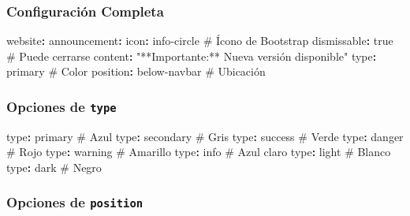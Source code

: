 \documentclass[
  doc,
  floatsintext,
  longtable,
  a4paper,
  nolmodern,
  notxfonts,
  notimes,
  12pt,
  colorlinks=true,linkcolor=blue,citecolor=blue,urlcolor=blue]{apa7}
\newenvironment{Shaded}{\begin{snugshade}}{\end{snugshade}}
\newcommand{\AttributeTok}[1]{\textcolor[rgb]{0.40,0.45,0.13}{#1}}
\newcommand{\CharTok}[1]{\textcolor[rgb]{0.13,0.47,0.30}{#1}}
\newcommand{\CommentTok}[1]{\textcolor[rgb]{0.37,0.37,0.37}{#1}}
\newcommand{\FunctionTok}[1]{\textcolor[rgb]{0.28,0.35,0.67}{#1}}
\newcommand{\KeywordTok}[1]{\textcolor[rgb]{0.00,0.23,0.31}{\textbf{#1}}}
\newcommand{\StringTok}[1]{\textcolor[rgb]{0.13,0.47,0.30}{#1}}
\begin{document}
\subsubsection{Configuración Completa}\label{configuraciuxf3n-completa}

\begin{Shaded}
\begin{Highlighting}[]
\FunctionTok{website}\KeywordTok{:}
\AttributeTok{  }\FunctionTok{announcement}\KeywordTok{:}
\AttributeTok{    }\FunctionTok{icon}\KeywordTok{:}\AttributeTok{ info{-}circle}\CommentTok{               \# Ícono de Bootstrap}
\AttributeTok{    }\FunctionTok{dismissable}\KeywordTok{:}\AttributeTok{ }\CharTok{true}\CommentTok{               \# Puede cerrarse}
\AttributeTok{    }\FunctionTok{content}\KeywordTok{:}\AttributeTok{ }\StringTok{"**Importante:** Nueva versión disponible"}
\AttributeTok{    }\FunctionTok{type}\KeywordTok{:}\AttributeTok{ primary}\CommentTok{                   \# Color}
\AttributeTok{    }\FunctionTok{position}\KeywordTok{:}\AttributeTok{ below{-}navbar}\CommentTok{          \# Ubicación}
\end{Highlighting}
\end{Shaded}

\subsubsection{\texorpdfstring{Opciones de
\texttt{type}}{Opciones de type}}\label{opciones-de-type}

\begin{Shaded}
\begin{Highlighting}[]
\FunctionTok{type}\KeywordTok{:}\AttributeTok{ primary}\CommentTok{      \# Azul}
\FunctionTok{type}\KeywordTok{:}\AttributeTok{ secondary}\CommentTok{    \# Gris}
\FunctionTok{type}\KeywordTok{:}\AttributeTok{ success}\CommentTok{      \# Verde}
\FunctionTok{type}\KeywordTok{:}\AttributeTok{ danger}\CommentTok{       \# Rojo}
\FunctionTok{type}\KeywordTok{:}\AttributeTok{ warning}\CommentTok{      \# Amarillo}
\FunctionTok{type}\KeywordTok{:}\AttributeTok{ info}\CommentTok{         \# Azul claro}
\FunctionTok{type}\KeywordTok{:}\AttributeTok{ light}\CommentTok{        \# Blanco}
\FunctionTok{type}\KeywordTok{:}\AttributeTok{ dark}\CommentTok{         \# Negro}
\end{Highlighting}
\end{Shaded}

\subsubsection{\texorpdfstring{Opciones de
\texttt{position}}{Opciones de position}}\label{opciones-de-position}
\end{document}
